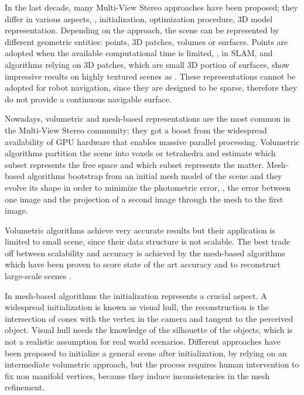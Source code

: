 In the last decade, many Multi-View Stereo approaches have been proposed; they differ in various aspects, \eg, initialization, optimization procedure, 3D model representation.
Depending on the approach, the scene can be represented by different geometric entities: points, 3D patches, volumes or surfaces.
Points are adopted when the available computational time is limited, \eg, in SLAM, and algorithms relying on 3D patches, which are small 3D portion of surfaces,  show impressive results on highly textured scenes as \cite{furukawa2009reconstructing}. 
These representations cannot be adopted for robot navigation, since they are designed to be sparse, therefore they do not provide a continuous navigable surface.

Nowadays, volumetric and mesh-based representations are the most common in the Multi-View Stereo community; they got a boost from the widespread availability of GPU hardware that enables massive parallel processing.
Volumetric algorithms partition the scene into voxels or tetrahedra and estimate which subset represents the free space and which subset represents the matter.
Mesh-based algorithms bootstrap from an initial mesh model of the scene and they evolve its shape in order to minimize the photometric error, \ie, the error between one image and the projection of a second image through the mesh to the first image.

Volumetric algorithms achieve very accurate results but their application is limited to small scene, since their data structure is not scalable. 
The best trade off between scalability and accuracy is achieved by the mesh-based algorithms which have been proven to score state of the art accuracy \cite{li2015detail} and to reconstruct large-scale scenes \cite{vu_et_al_2012}.


In mesh-based algorithms the initialization represents a crucial aspect.
A widespread initialization is known as visual hull, the reconstruction is the intersection of cones with the vertex in the camera and tangent to the perceived object.
Visual hull needs the knowledge of the silhouette of the objects, which is not a realistic assumption for real world scenarios.
Different approaches have been proposed to initialize a general scene after initialization, by relying on an intermediate volumetric approach, but the process requires human intervention to fix non manifold vertices, because they induce inconsistencies in the mesh refinement.

